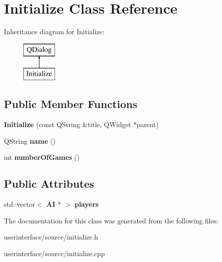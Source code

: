 \section{Initialize Class Reference}
\label{class_initialize}
Inheritance diagram for Initialize\-:\begin{figure}[H]
\begin{center}
\leavevmode
\includegraphics[height=2.000000cm]{class_initialize}
\end{center}
\end{figure}
\subsection*{Public Member Functions}
\begin{DoxyCompactItemize}
\item 
{\bfseries Initialize} (const Q\-String \&title, Q\-Widget $\ast$parent)\label{class_initialize_ac74c7a2fe5cdf5499d0798d4e487f819}

\item 
Q\-String {\bfseries name} ()\label{class_initialize_aad22139b103dbcc5ba568eec9e68e270}

\item 
int {\bfseries number\-Of\-Games} ()\label{class_initialize_a3aa15f1e0f87b9abf1c76af3acb6bd60}

\end{DoxyCompactItemize}
\subsection*{Public Attributes}
\begin{DoxyCompactItemize}
\item 
std\-::vector$<$ {\bf A\-I} $\ast$ $>$ {\bfseries players}\label{class_initialize_a8dc832a3f413c754da6a550f69885bb5}

\end{DoxyCompactItemize}


The documentation for this class was generated from the following files\-:\begin{DoxyCompactItemize}
\item 
userinterface/source/initialize.\-h\item 
userinterface/source/initialize.\-cpp\end{DoxyCompactItemize}
